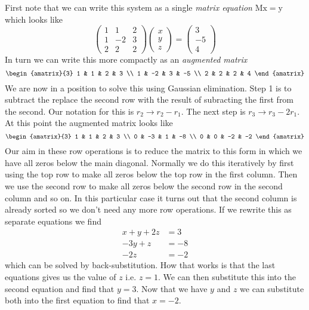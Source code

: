 First note that we can write this system as a single \emph{matrix equation}
$\mathrm{Mx} = \mathrm{y}$ which looks like
\[
    \begin{pmatrix}
        1 & 1 & 2 \\
        1 & -2 & 3 \\
        2 & 2 & 2
    \end{pmatrix}
    \begin{pmatrix}
        x \\ y \\ z
    \end{pmatrix}
       =
    \begin{pmatrix}
        3 \\ -5 \\ 4
    \end{pmatrix}
\]
In turn we can write this more compactly as an \emph{augmented matrix}
\[
    \begin{amatrix}{3}
        1 & 1 & 2 & 3 \\
        1 & -2 & 3 & -5 \\
        2 & 2 & 2 & 4
    \end{amatrix}
\]
We are now in a position to solve this using Gaussian elimination. Step 1 is
to subtract the replace the second row with the result of subracting the first
from the second. Our notation for this is $r_2 \to r_2 - r_1$. The next step
is $r_3 \to r_3 - 2r_1$. At this point the augmented matrix looks like
\[
    \begin{amatrix}{3}
        1 & 1 & 2 & 3 \\
        0 & -3 & 1 & -8 \\
        0 & 0 & -2 & -2
    \end{amatrix}
\]
Our aim in these row operations is to reduce the matrix to this form in which
we have all zeros below the main diagonal. Normally we do this iteratively by
first using the top row to make all zeros below the top row in the first
column. Then we use the second row to make all zeros below the second row in
the second column and so on. In this particular case it turns out that the
second column is already sorted so we don't need any more row operations.
If we rewrite this as separate equations we find
\begin{align*}
    x +y + 2z &= 3\\
     -3y + z  &= -8\\
          -2z &= -2
    \label{system1}
\end{align*}
which can be solved by back-substitution. How that works is that the last
equations gives us the value of $z$ i.e. $z=1$. We can then substitute this
into the second equation and find that $y=3$. Now that we have $y$ and $z$ we
can substitute both into the first equation to find that $x=-2$.
